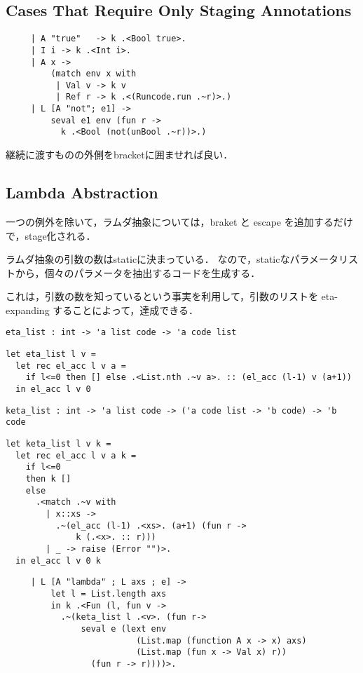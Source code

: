 \documentclass[10pt,a4paper]{jarticle}
\theoremstyle{definition}
\begin{document}
\subsection{Cases That Require Only Staging Annotations}
{\small
\begin{verbatim}
     | A "true"   -> k .<Bool true>.
     | I i -> k .<Int i>.
     | A x ->
	     (match env x with
	      | Val v -> k v
	      | Ref r -> k .<(Runcode.run .~r)>.)
     | L [A "not"; e1] ->
	     seval e1 env (fun r ->
           k .<Bool (not(unBool .~r))>.)
\end{verbatim}}
継続に渡すものの外側をbracketに囲ませれば良い．

\subsection{Lambda Abstraction}
一つの例外を除いて，ラムダ抽象については，braket と escape を追加するだけで，stage化される．

ラムダ抽象の引数の数はstaticに決まっている．
なので，staticなパラメータリストから，個々のパラメータを抽出するコードを生成する．

これは，引数の数を知っているという事実を利用して，引数のリストを eta-expanding することによって，達成できる．

{\small
\begin{verbatim}
eta_list : int -> 'a list code -> 'a code list
\end{verbatim}}
{\small
\begin{verbatim}
let eta_list l v =
  let rec el_acc l v a =
    if l<=0 then [] else .<List.nth .~v a>. :: (el_acc (l-1) v (a+1))
  in el_acc l v 0
\end{verbatim}}

{\small
\begin{verbatim}
keta_list : int -> 'a list code -> ('a code list -> 'b code) -> 'b code
\end{verbatim}}
{\small
\begin{verbatim}
let keta_list l v k =
  let rec el_acc l v a k =
    if l<=0
    then k []
    else
      .<match .~v with
	    | x::xs ->
	      .~(el_acc (l-1) .<xs>. (a+1) (fun r ->
	          k (.<x>. :: r)))
	    | _ -> raise (Error "")>.
  in el_acc l v 0 k
\end{verbatim}}


{\small
\begin{verbatim}
     | L [A "lambda" ; L axs ; e] ->
	     let l = List.length axs
	     in k .<Fun (l, fun v ->
           .~(keta_list l .<v>. (fun r->
               seval e (lext env
                          (List.map (function A x -> x) axs)
                          (List.map (fun x -> Val x) r))
                 (fun r -> r))))>.
\end{verbatim}}
\end{document}
